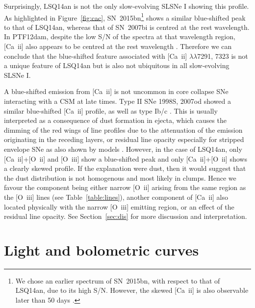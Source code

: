 \documentclass[useAMS,usenatbib]{mn2e}
\def\an{LSQ14an}
\def\oiii{[O~{\sc iii}]}
\begin{document}
Surprisingly, \an\/ is not the only slow-evolving SLSNe I showing this profile. As highlighted in Figure~\ref{fig:cac}, 
SN~2015bn\footnote{We chose an earlier spectrum of SN~2015bn, with respect to that of \an\/, due to its high S/N. However, the skewed [Ca~{\sc ii}] is also observable later than 50 days \citep[see][]{ni16a}.} 
shows a similar blue-shifted peak to that of \an\/, whereas that of SN~2007bi is centred at the rest wavelength. In PTF12dam, despite the low S/N of the spectra at that wavelength region, [Ca~{\sc ii}] also appears to be centred at the rest wavelength \citep[see extended data fig. 3 in][]{ni13}. Therefore we can conclude that the blue-shifted feature associated with [Ca~{\sc ii}]  $\lambda\lambda$7291, 7323 is not a unique feature of \an\/ but is also not ubiquitous in all slow-evolving SLSNe I.

A blue-shifted emission from [Ca~{\sc ii}] is not uncommon in core collapse SNe interacting with a CSM at late times.
Type II SNe 1998S, 2007od \citep{po04,in11} showed a similar blue-shifted [Ca~{\sc ii}] profile, as well as type Ib/c \citep[e.g.][]{ta09,mi10}. This is usually interpreted as a consequence of dust formation in ejecta, which causes the dimming of the red wings of line profiles due to the attenuation of the emission originating in the receding layers, or residual line opacity especially for stripped envelope SNe as also shown by models \citep[see][]{je15}. However, in the case of LSQ14an, 
only [Ca~{\sc ii}]+[O~{\sc ii}] and \oiii\/ show a blue-shifted peak and only [Ca~{\sc ii}]+[O~{\sc ii}] shows a clearly skewed profile.
If the explanation were dust, then it would suggest that the dust distribution is not homogenous and most likely in clumps. Hence 
we favour the component being either narrow [O~{\sc ii}]  arising from the same region as the [O~{\sc iii}]  lines (see Table~\ref{table:lines}), 
another component of [Ca~{\sc ii}] also located physically with the narrow [O~{\sc iii}] emitting region, or an effect of the residual line opacity. 
See Section~\ref{sec:dis} for more discussion and interpretation.

\section{Light and bolometric curves}\label{sec:lc}
\end{document}
